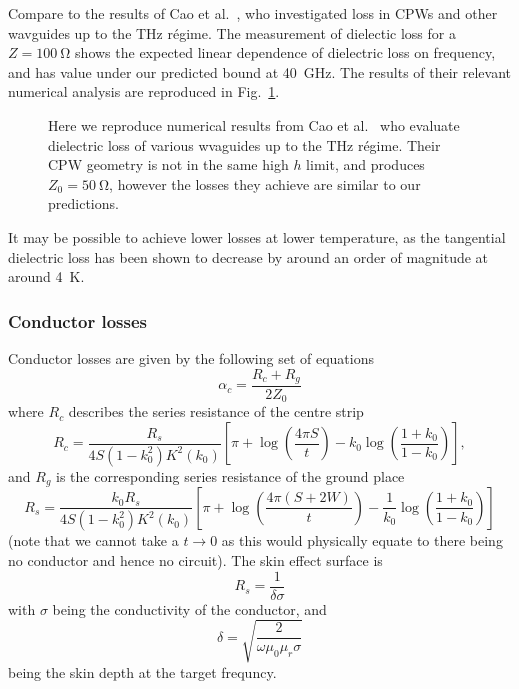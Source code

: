 Compare to the results of  Cao et al.~\cite{L.Cao2013}, who
investigated loss in CPWs and other wavguides up to the \si{\tera\hertz}
r\'egime. The measurement of dielectic loss for a $Z=\SI{100}{\ohm}$ shows the
expected linear dependence of dielectric loss on frequency, and has value under
our predicted bound at \SI{40}{\giga\hertz}. The results of their relevant
numerical analysis are reproduced in Fig.~\ref{fig:CaoFig9}.

\begin{figure}
  \caption{Here we reproduce numerical results from Cao et al.~\cite{L.Cao2013}
  who evaluate dielectric loss of various wvaguides up to the \si{\tera\hertz}
  r\'egime. Their CPW geometry is not in the same high $h$ limit, and produces
  $Z_0 = \SI{50}{\ohm}$, however the losses they achieve are similar to our
  predictions.
  }
  \label{fig:CaoFig9}
\end{figure}

It may be possible to achieve lower losses at lower temperature, as the
tangential dielectric loss has been shown to decrease by around an order of
magnitude at around \SI{4}{\kelvin}. \cite{1717770}

\subsubsection*{Conductor losses}

Conductor losses are given by the following set of equations\cite{Simons2004}
\begin{equation}
  \alpha_c = \frac{R_c +R_g}{2Z_0}
\end{equation}
where $R_c$ describes the series resistance of the centre strip
\begin{equation}
  R_c = \frac{R_s}{4 S(1-k_0^2)K^2(k_0)}\left[ \pi + \log\left(\frac{4\pi
  S}{t}\right) - k_0\log\left(\frac{1+k_0}{1-k_0}\right) \right],
\end{equation}
and $R_g$ is the corresponding series resistance of the ground place
\begin{equation}
  R_s = \frac{k_0 R_s}{4S(1-k_0^2)K^2(k_0)}\left[\pi +
  \log\left(\frac{4\pi(S+2W)}{t}\right) -
  \frac{1}{k_0}\log\left(\frac{1+k_0}{1-k_0}\right)\right]
\end{equation}
(note that we cannot take a $t\to 0$ as this would physically equate to there
being no conductor and hence no circuit). The skin effect surface is
\begin{equation}
  R_s = \frac{1}{\delta\sigma}
\end{equation}
with $\sigma$ being the conductivity of the conductor, and
\begin{equation}
  \delta = \sqrt{\frac{2}{\omega\mu_0\mu_r\sigma}}
\end{equation}
being the skin depth at the target frequncy.

